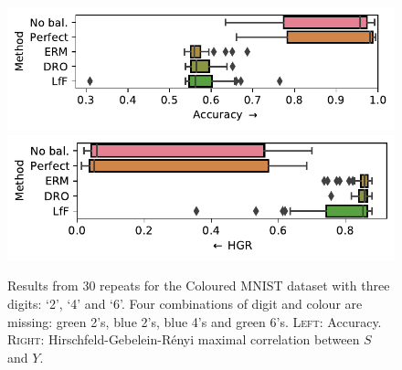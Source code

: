 \begin{figure}[ht]
  \centering
  \includegraphics[width=\columnwidth]{paper3/figures/cmnist_3dig_4miss_acc.pdf}
  \includegraphics[width=\columnwidth]{paper3/figures/cmnist_3dig_4miss_hgr.pdf}
  \caption{
    Results from 30 repeats for the Coloured MNIST dataset with three digits: `2', `4' and `6'.
    Four combinations of digit and colour are missing: {\color{green}green} 2's, {\color{blue}blue} 2's, {\color{blue}blue} 4's and {\color{green}green} 6's.
    \textsc{Left}: Accuracy.
    \textsc{Right}: Hirschfeld-Gebelein-R\'enyi maximal correlation \citep{renyi1959measures} between $S$ and $Y$.
  }%
  \label{fig:cmnist-3dig-4miss}
\end{figure}

